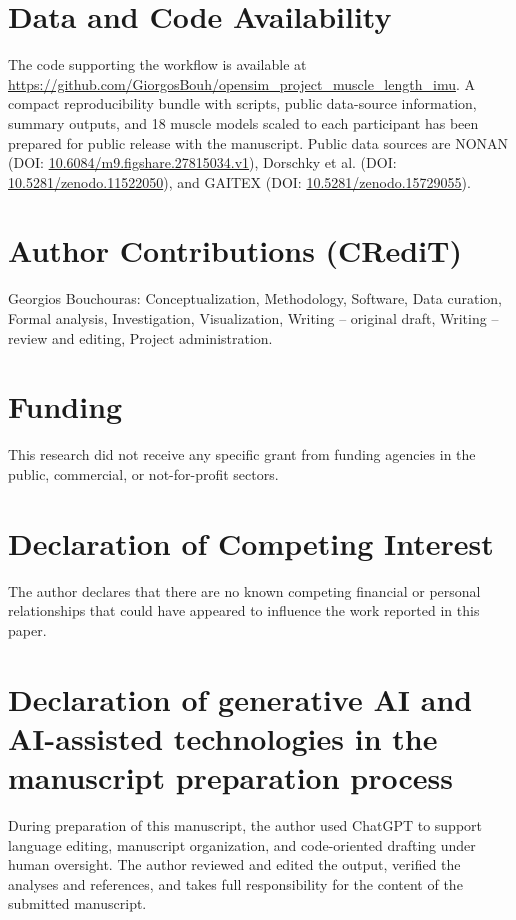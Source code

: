 \documentclass[11pt]{article}
\begin{document}
\section*{Data and Code Availability}

The code supporting the workflow is available at \url{https://github.com/GiorgosBouh/opensim_project_muscle_length_imu}. A compact reproducibility bundle with scripts, public data-source information, summary outputs, and 18 muscle models scaled to each participant has been prepared for public release with the manuscript. Public data sources are NONAN (DOI: \url{10.6084/m9.figshare.27815034.v1}), Dorschky et al. (DOI: \url{10.5281/zenodo.11522050}), and GAITEX (DOI: \url{10.5281/zenodo.15729055}).

\section*{Author Contributions (CRediT)}

Georgios Bouchouras: Conceptualization, Methodology, Software, Data curation, Formal analysis, Investigation, Visualization, Writing -- original draft, Writing -- review and editing, Project administration.

\section*{Funding}

This research did not receive any specific grant from funding agencies in the public, commercial, or not-for-profit sectors.

\section*{Declaration of Competing Interest}

The author declares that there are no known competing financial or personal relationships that could have appeared to influence the work reported in this paper.

\section*{Declaration of generative AI and AI-assisted technologies in the manuscript preparation process}

During preparation of this manuscript, the author used ChatGPT to support language editing, manuscript organization, and code-oriented drafting under human oversight. The author reviewed and edited the output, verified the analyses and references, and takes full responsibility for the content of the submitted manuscript.
\end{document}
